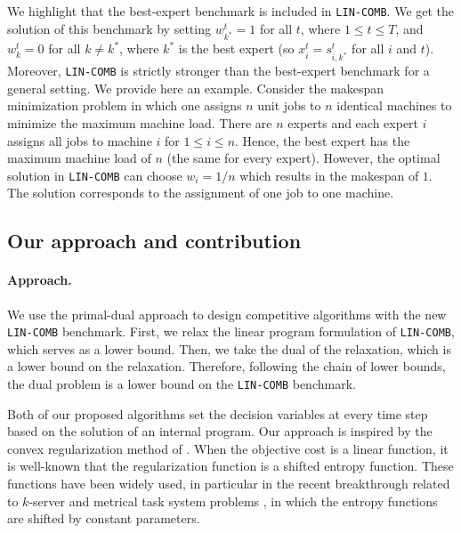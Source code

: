 We highlight that the best-expert benchmark is included in \texttt{LIN-COMB}. We get the solution of this benchmark by setting $w^{t}_{k^{*}} = 1$ for all $t$, where $1 \leq t \leq T$, and $w^{t}_{k} = 0$ for all $k \neq k^{*}$,
where $k^{*}$ is the best expert (so $x_{i}^{t} = s_{i,k^{*}}^{t}$ for all $i$ and $t$).
Moreover, \texttt{LIN-COMB} is strictly stronger than the best-expert benchmark for a general setting. We provide here an example. 
Consider the makespan minimization problem in which one assigns $n$ unit jobs to $n$ identical machines to minimize the maximum machine load.   
There are $n$ experts and each expert $i$ assigns all jobs to machine $i$ for $1 \leq i \leq n$. Hence, the best expert has the maximum machine load of $n$ (the same for every expert). However, the optimal solution in \texttt{LIN-COMB} can choose $w_{i} = 1/n$ which results in the makespan of $1$. The solution corresponds to the assignment of one job to one machine.  

\subsection{Our approach and contribution}

\paragraph{Approach.} We use the primal-dual approach to design competitive algorithms with the new \texttt{LIN-COMB} benchmark. First, we relax the linear program formulation of \texttt{LIN-COMB}, which serves as a lower bound. Then, we take the dual of the relaxation, which is a lower bound on the relaxation. Therefore, following the chain of lower bounds, the dual problem is a lower bound on the \texttt{LIN-COMB} benchmark. 

Both of our proposed algorithms set the decision variables at every time step based on the solution of an internal program. Our approach is inspired by the
convex regularization method of \cite{BuchbinderChen14:Competitive-Analysis}.
When the objective cost is a linear function, it is well-known that the regularization function is a shifted entropy function.
These functions have been widely used, in particular in the recent breakthrough related to $k$-server \cite{BubeckCohen18:K-server-via-multiscale,BuchbinderGupta19:k-servers-with}
and metrical task system problems \cite{BubeckCohen21:Metrical-task},
in which the entropy functions are shifted by constant parameters.

